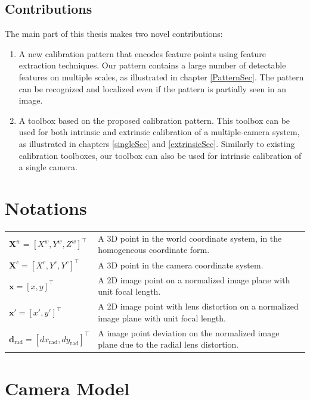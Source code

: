 \documentclass{report}
\begin{document}
\section{Contributions}

The main part of this thesis makes two novel contributions: 

\begin{enumerate}
\item A new calibration pattern that encodes feature points using feature extraction techniques. Our pattern contains a large number of detectable features on multiple scales, as illustrated in chapter \ref{PatternSec}. The pattern can be recognized and localized even if the pattern is partially seen in an image. 
\item A toolbox based on the proposed calibration pattern. This toolbox can be used for both intrinsic and extrinsic calibration of a multiple-camera system, as illustrated in chapters \ref{singleSec} and \ref{extrinsicSec}. Similarly to existing calibration toolboxes, our toolbox can also be used for intrinsic calibration of a single camera. 
\end{enumerate}

\chapter{Notations}
\begin{tabular}{ll}
$\mathbf{X}^w = [X^w, Y^w, Z^w]^\top$ & A 3D point in the world coordinate system, in the homogeneous coordinate form.\\
$\mathbf{X}^c = [X^c, Y^c, Y^c]^\top$ & A 3D point in the camera coordinate system. \\
$\mathbf{x} = [x, y]^\top$ & A 2D image point on a normalized image plane with unit focal length. \\
$\mathbf{x}' = [x', y']^\top$ & A 2D image point with lens distortion on a normalized image plane with unit focal length. \\
$\mathbf{d}_\text{rad} = [dx_\text{rad}, dy_\text{rad}]^\top$ & A image point deviation on the normalized image plane due to the radial lens distortion. 
\end{tabular}

\chapter{Camera Model}
\end{document}
